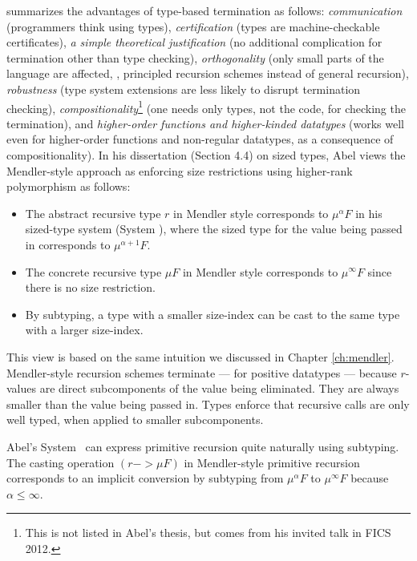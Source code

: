 \citet{abel06phd,Abel12talkFICS} summarizes the advantages of
type-based termination as follows:
\emph{communication} (programmers think using types),
\emph{certification} (types are machine-checkable certificates),
\emph{a simple theoretical justification}
        (no additional complication for termination other than type checking),
\emph{orthogonality} (only small parts of the language are affected,
        \eg, principled recursion schemes instead of general recursion),
\emph{robustness} (type system extensions are less likely to
                        disrupt termination checking),
\emph{compositionality}\footnote{This is not listed in Abel's thesis,
                                but comes from his invited talk in FICS 2012.}
        (one needs only types, not the code, for checking the termination), and
\emph{higher-order functions and higher-kinded datatypes}
        (works well even for higher-order functions and non-regular datatypes,
        as a consequence of compositionality).
In his dissertation \cite{abel06phd} (Section 4.4) on sized types,
Abel views the Mendler-style approach as enforcing size restrictions
using higher-rank polymorphism as follows:
\begin{itemize}
\item The abstract recursive type $r$ in Mendler style corresponds to
        $\mu^\alpha F$ in his sized-type system (System \Fwhat),
        where the sized type
        for the value being passed in corresponds to $\mu^{\alpha+1} F$.
\item The concrete recursive type $\mu F$ in Mendler style corresponds to
        $\mu^\infty F$ since there is no size restriction.
\item {}
	By subtyping, a type with a smaller size-index can be cast to
        the same type with a larger size-index.
\end{itemize}
This view is based on the same intuition we discussed in
Chapter \ref{ch:mendler}. Mendler-style recursion schemes terminate --- for
positive datatypes --- because $r$-values are direct subcomponents
of the value being eliminated. They are always smaller
than the value being passed in. Types enforce that recursive calls
are only well typed, when applied to smaller subcomponents.

Abel's System \Fwhat\ can express primitive recursion quite naturally
using subtyping. The casting operation $(r -> \mu F)$ in Mendler-style
primitive recursion corresponds to an implicit conversion by subtyping
from $\mu^\alpha F$ to $\mu^\infty F$ because $\alpha \leq \infty$.

